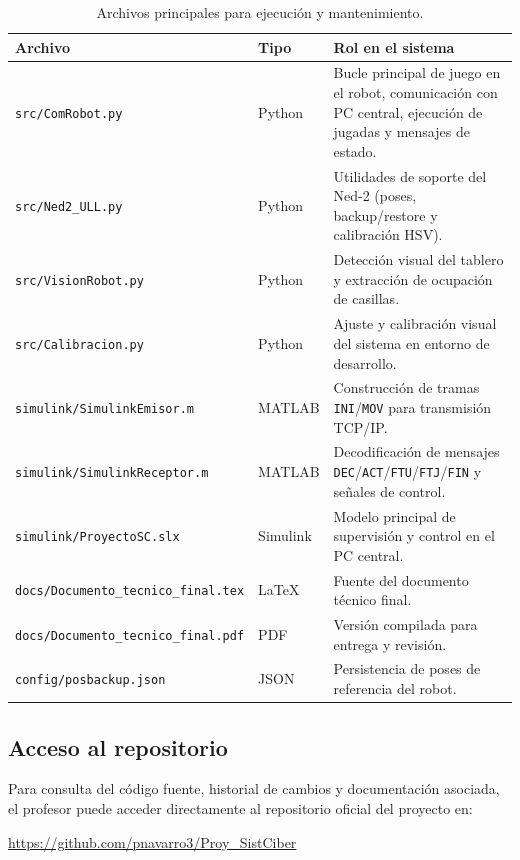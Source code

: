 \documentclass[12pt,a4paper]{article}
\begin{document}
\begin{table}[H]
\centering
\footnotesize
\begin{tabular}{P{0.34\textwidth} P{0.12\textwidth} P{0.44\textwidth}}
\toprule
\textbf{Archivo} & \textbf{Tipo} & \textbf{Rol en el sistema} \\
\midrule
\texttt{src/ComRobot.py} & Python & Bucle principal de juego en el robot, comunicación con PC central, ejecución de jugadas y mensajes de estado. \\
\texttt{src/Ned2\_ULL.py} & Python & Utilidades de soporte del Ned-2 (poses, backup/restore y calibración HSV). \\
\texttt{src/VisionRobot.py} & Python & Detección visual del tablero y extracción de ocupación de casillas. \\
\texttt{src/Calibracion.py} & Python & Ajuste y calibración visual del sistema en entorno de desarrollo. \\
\texttt{simulink/SimulinkEmisor.m} & MATLAB & Construcción de tramas \texttt{INI}/\texttt{MOV} para transmisión TCP/IP. \\
\texttt{simulink/SimulinkReceptor.m} & MATLAB & Decodificación de mensajes \texttt{DEC}/\texttt{ACT}/\texttt{FTU}/\texttt{FTJ}/\texttt{FIN} y señales de control. \\
\texttt{simulink/ProyectoSC.slx} & Simulink & Modelo principal de supervisión y control en el PC central. \\
\texttt{docs/}\allowbreak\texttt{Documento\_tecnico\_final.tex} & LaTeX & Fuente del documento técnico final. \\
\texttt{docs/}\allowbreak\texttt{Documento\_tecnico\_final.pdf} & PDF & Versión compilada para entrega y revisión. \\
\texttt{config/posbackup.json} & JSON & Persistencia de poses de referencia del robot. \\
\bottomrule
\end{tabular}
\caption{Archivos principales para ejecución y mantenimiento.}
\end{table}

\subsection{Acceso al repositorio}

Para consulta del código fuente, historial de cambios y documentación asociada, el profesor puede acceder directamente al repositorio oficial del proyecto en:

\begin{center}
\url{https://github.com/pnavarro3/Proy_SistCiber}
\end{center}
\end{document}
